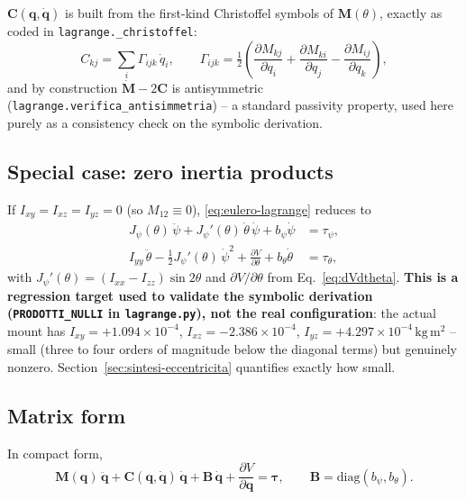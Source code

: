 \documentclass[11pt,a4paper]{article}
\numberwithin{equation}{section}
\newcommand{\bs}[1]{\boldsymbol{#1}}
\begin{document}
$\bs C(\bs q,\dot{\bs q})$ is built from the first-kind Christoffel symbols of $\bs M(\theta)$, exactly as coded in \texttt{lagrange.\allowbreak\_christoffel}:
\begin{equation}
C_{kj} = \sum_{i} \Gamma_{ijk}\,\dot q_i ,
\qquad
\Gamma_{ijk} = \tfrac12\left(\frac{\partial M_{kj}}{\partial q_i} + \frac{\partial M_{ki}}{\partial q_j} - \frac{\partial M_{ij}}{\partial q_k}\right),
\label{eq:christoffel}
\end{equation}
and by construction $\dot{\bs M} - 2\bs C$ is antisymmetric (\texttt{lagrange.verifica\_antisimmetria}) -- a standard passivity property, used here purely as a consistency check on the symbolic derivation.

\subsection{Special case: zero inertia products}
\label{subsec:caso-diagonale}

If $I_{xy}=I_{xz}=I_{yz}=0$ (so $M_{12}\equiv0$), \eqref{eq:eulero-lagrange} reduces to
\begin{align}
J_\psi(\theta)\,\ddot\psi + J_\psi'(\theta)\,\dot\theta\,\dot\psi + b_\psi\dot\psi &= \tau_\psi , \label{eq:eom-psi}\\
I_{yy}\,\ddot\theta - \tfrac12 J_\psi'(\theta)\,\dot\psi^2 + \frac{\partial V}{\partial\theta} + b_\theta\dot\theta &= \tau_\theta , \label{eq:eom-theta}
\end{align}
with $J_\psi'(\theta) = (I_{xx}-I_{zz})\sin2\theta$ and $\partial V/\partial\theta$ from Eq.~\eqref{eq:dVdtheta}. \textbf{This is a regression target used to validate the symbolic derivation (\texttt{PRODOTTI\_NULLI} in \texttt{lagrange.py}), not the real configuration}: the actual mount has $I_{xy}=+1.094\times10^{-4}$, $I_{xz}=-2.386\times10^{-4}$, $I_{yz}=+4.297\times10^{-4}\,\mathrm{kg\,m^2}$ -- small (three to four orders of magnitude below the diagonal terms) but genuinely nonzero. Section~\ref{sec:sintesi-eccentricita} quantifies exactly how small.

\subsection{Matrix form}

In compact form,
\begin{equation}
\bs M(\bs q)\,\ddot{\bs q} + \bs C(\bs q,\dot{\bs q})\,\dot{\bs q} + \bs B\,\dot{\bs q} + \frac{\partial V}{\partial\bs q} = \bs\tau ,
\qquad \bs B=\mathrm{diag}(b_\psi,b_\theta).
\label{eq:eom-matrix}
\end{equation}
\end{document}

